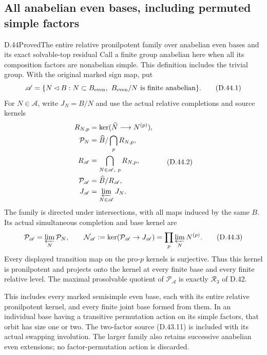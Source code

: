 \subsection{All anabelian even bases, including permuted simple factors}

\begin{statement}{D.44}{Proved}{The entire relative pronilpotent family over anabelian even bases and its exact solvable-top residual}
Call a finite group anabelian here when all its composition factors are
nonabelian simple. This definition includes the trivial group. With
the original marked sign map, put
\[
 \mathscr A=\{N\lhd B:N\subset B_{\rm even},\
                         B_{\rm even}/N\text{ is finite anabelian}\}.
                                                               \tag{D.44.1}
\]
For \(N\in\mathscr A\), write \(J_N=B/N\) and use the actual
relative completions and source kernels
\[
 \begin{split}
 R_{N,p}&=\ker(\widehat N\longrightarrow N^{(p)}),\\
 \mathcal P_N&=\widehat B/\bigcap_pR_{N,p},\\
 R_{\mathscr A}&=\bigcap_{N\in\mathscr A,\ p}R_{N,p},\\
 \mathcal P_{\mathscr A}&=\widehat B/R_{\mathscr A},\\
 J_{\mathscr A}&=\varprojlim_{N\in\mathscr A}J_N .
 \end{split}                                                   \tag{D.44.2}
\]
The family is directed under intersections, with all maps induced
by the same \(B\). Its actual simultaneous completion and base
kernel are
\[
 \mathcal P_{\mathscr A}=\varprojlim_N\mathcal P_N,\qquad
 \mathcal N_{\mathscr A}:=\ker(\mathcal P_{\mathscr A}\to J_{\mathscr A})
                  =\prod_p\varprojlim_N N^{(p)}.                \tag{D.44.3}
\]
Every displayed transition map on the pro-\(p\) kernels is
surjective. Thus this kernel is pronilpotent and projects onto
the kernel at every finite base and every finite relative level.
The maximal prosolvable quotient of \(\mathcal P_{\mathscr A}\)
is exactly \(\mathcal R_3\) of D.42.

This includes every marked semisimple even base, each with its
entire relative pronilpotent kernel, and every finite joint base
formed from them. In an individual base having a transitive
permutation action on its simple factors, that orbit has size
one or two. The two-factor source (D.43.11) is included with its
actual swapping involution. The larger family also retains
successive anabelian even extensions; no factor-permutation
action is discarded.


\end{statement}
